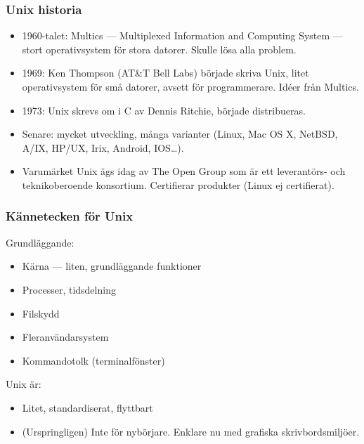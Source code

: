 \begin{frame}[fragile=singleslide]
    \frametitle{Unix historia}
    \begin{itemize}
        \item 1960-talet: Multics --- Multiplexed Information and Computing System --- stort operativsystem för stora datorer. Skulle lösa alla problem.
        \item 1969: Ken Thompson (AT\&T Bell Labs) började skriva Unix, litet operativsystem för små datorer, avsett för programmerare. Idéer från Multics.
        \item 1973: Unix skrevs om i C av Dennis Ritchie, började distribueras.
        \item Senare: mycket utveckling, många varianter (Linux, Mac OS X, NetBSD, A/IX, HP/UX, Irix, Android, IOS\ldots).
        \item Varumärket Unix ägs idag av The Open Group som är ett leverantörs- och teknikoberoende konsortium. Certifierar produkter (Linux ej certifierat).
    \end{itemize}
\end{frame}

\begin{frame}[fragile=singleslide]
    \frametitle{Kännetecken för Unix}
    Grundläggande:
    \begin{itemize}
        \item Kärna --- liten, grundläggande funktioner
        \item Processer, tidsdelning
        \item Filskydd
        \item Fleranvändarsystem
        \item Kommandotolk (terminalfönster)
    \end{itemize}
    Unix är:
    \begin{itemize}
        \item Litet, standardiserat, flyttbart
        \item (Urspringligen) Inte för nybörjare. Enklare nu med grafiska skrivbordsmiljöer.
    \end{itemize}
\end{frame}

